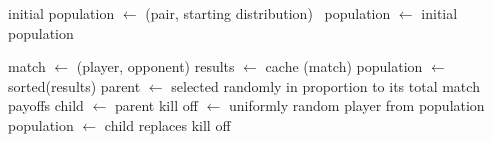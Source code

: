\documentclass{article}
\begin{document}
  \begin{algorithmic}[1]
  \STATE initial population $\gets$ (pair, starting distribution) \
  \STATE population $\gets$ initial population

        \STATE match $\gets$ (player, opponent)
        \STATE results $\gets$ cache (match)
        \ENDFOR
      \ENDFOR
      \STATE population $\gets$ sorted(results)
      \STATE parent $\gets$ selected randomly in proportion to its total match payoffs
      \STATE child $\gets$ parent
      \STATE kill off $\gets$ uniformly random player from population
      \STATE population $\gets$ child replaces kill off
    \ENDWHILE
  \end{algorithmic}
\end{document}
